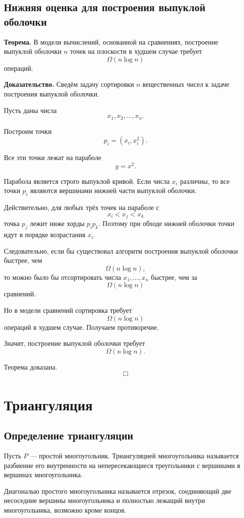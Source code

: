 \documentclass[12pt,a4paper]{article}
\begin{document}
\subsection{Нижняя оценка для построения выпуклой оболочки}

\textbf{Теорема.}
В модели вычислений, основанной на сравнениях, построение выпуклой оболочки \(n\) точек на плоскости в худшем случае требует
\[
\Omega(n\log n)
\]
операций.

\textbf{Доказательство.}
Сведём задачу сортировки \(n\) вещественных чисел к задаче построения выпуклой оболочки.

Пусть даны числа
\[
x_1,x_2,\dots,x_n.
\]

Построим точки
\[
p_i=(x_i,x_i^2).
\]

Все эти точки лежат на параболе
\[
y=x^2.
\]

Парабола является строго выпуклой кривой. Если числа \(x_i\) различны, то все точки \(p_i\) являются вершинами нижней части выпуклой оболочки.

Действительно, для любых трёх точек на параболе с
\[
x_i<x_j<x_k
\]
точка \(p_j\) лежит ниже хорды \(p_ip_k\). Поэтому при обходе нижней оболочки точки идут в порядке возрастания \(x_i\).

Следовательно, если бы существовал алгоритм построения выпуклой оболочки быстрее, чем
\[
\Omega(n\log n),
\]
то можно было бы отсортировать числа \(x_1,\dots,x_n\) быстрее, чем за
\[
\Omega(n\log n)
\]
сравнений.

Но в модели сравнений сортировка требует
\[
\Omega(n\log n)
\]
операций в худшем случае. Получаем противоречие.

Значит, построение выпуклой оболочки требует
\[
\Omega(n\log n).
\]

Теорема доказана.
\[
\Box
\]

\section{Триангуляция}

\subsection{Определение триангуляции}

Пусть \(P\) — простой многоугольник. Триангуляцией многоугольника называется разбиение его внутренности на непересекающиеся треугольники с вершинами в вершинах многоугольника.

Диагональю простого многоугольника называется отрезок, соединяющий две несоседние вершины многоугольника и полностью лежащий внутри многоугольника, возможно кроме концов.
\end{document}
